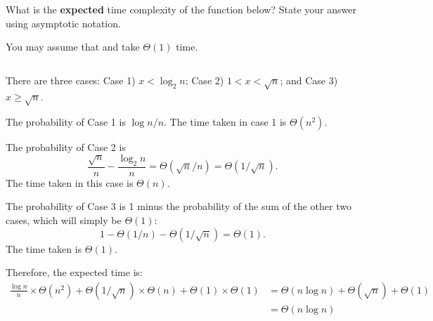 \begin{prob}
    What is the \textbf{expected} time complexity of the function below?
    State your answer using asymptotic notation.

    You may assume that  and  take
    $\Theta(1)$ time.

    \inputminted[lastline=15]{python}{\thisdir/code.py}


    \begin{soln}
        There are three cases: Case 1) $x < \log_2 n$; Case 2) $1 < x < \sqrt n$; and
        Case 3) $x \geq \sqrt{n}$.

        The probability of Case 1 is $\log n / n$. The time taken in case 1 is
        $\Theta(n^2)$.

        The probability of Case 2 is \[
            \frac{\sqrt n}{n} - \frac{\log_2 n}{n} = \Theta(\sqrt n / n) = \Theta(1/\sqrt n).
        \] The time taken in this case is $\Theta(n)$.

        The probability of Case 3 is 1 minus the probability of the sum of the
        other two cases, which will simply be $\Theta(1)$: \[
            1 - \Theta(1 / n) - \Theta(1 / \sqrt{n}) = \Theta(1).
        \] The time taken is $\Theta(1)$.

        Therefore, the expected time is:
        \begin{align*}
            \frac{\log n}{n} \times \Theta(n^2)
            + \Theta(1/\sqrt n) \times \Theta(n)
            + \Theta(1) \times \Theta(1)
            &=
            \Theta(n \log n) + \Theta(\sqrt n) + \Theta(1)
            \\
            &=
            \Theta(n \log n)
        \end{align*}
    \end{soln}

\end{prob}

